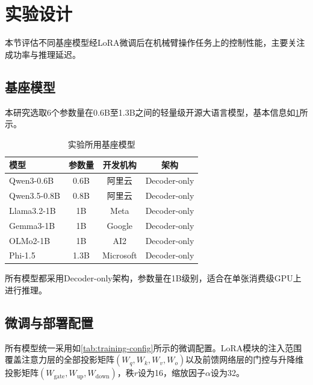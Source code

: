\section{实验设计}\label{sec:llm_experiment-design}
本节评估不同基座模型经LoRA微调后在机械臂操作任务上的控制性能，主要关注成功率与推理延迟。

\subsection{基座模型}
本研究选取6个参数量在0.6B至1.3B之间的轻量级开源大语言模型，基本信息如\cref{tab:base-models}所示。

\begin{table}[htbp]
  \centering
  \caption{实验所用基座模型}\label{tab:base-models}
  \begin{tabular}{lccc}
    \toprule
    模型 & 参数量 & 开发机构 & 架构 \\
    \midrule
    Qwen3-0.6B\cite{yang2025qwen3} & 0.6B & 阿里云 & Decoder-only \\
    Qwen3.5-0.8B\cite{yang2025qwen3} & 0.8B & 阿里云 & Decoder-only \\
    Llama3.2-1B\cite{grattafiori2024llama} & 1B & Meta & Decoder-only \\
    Gemma3-1B\cite{team2025gemma} & 1B & Google & Decoder-only \\
    OLMo2-1B\cite{olmo2024olmo2} & 1B & AI2 & Decoder-only \\
    Phi-1.5\cite{li2023phi} & 1.3B & Microsoft & Decoder-only \\
    \bottomrule
  \end{tabular}
\end{table}

所有模型都采用Decoder-only架构，参数量在1B级别，适合在单张消费级GPU上进行推理。

\subsection{微调与部署配置}
所有模型统一采用如\cref{tab:training-config}所示的微调配置。LoRA模块的注入范围覆盖注意力层的全部投影矩阵$(W_q, W_k, W_v, W_o)$以及前馈网络层的门控与升降维投影矩阵$(W_{\text{gate}}, W_{\text{up}}, W_{\text{down}})$，秩$r$设为16，缩放因子$\alpha$设为32。

